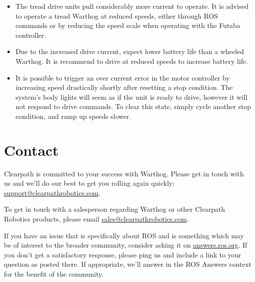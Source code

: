\documentclass[]{clearpath-latex/clearpath-manual}
\begin{document}
\begin{itemize}
\item The tread drive units pull considerably more current to operate. It is advised to operate a tread Warthog at reduced speeds, either through ROS commands or by reducing the speed scale when operating with the Futaba controller.
\item Due to the increased drive current, expect lower battery life than a wheeled Warthog. It is recommend to drive at reduced speeds to increase battery life.
\item It is possible to trigger an over current error in the motor controller by increasing speed drastically shortly after resetting a stop condition. The system's body lights will seem as if the unit is ready to drive, however it will not respond to drive commands. To clear this state, simply cycle another stop condition, and ramp up speeds slower.
\end{itemize}

\section{Contact}
\label{contact}

Clearpath is committed to your success with Warthog. Please get in touch with us and we’ll do our best to get
you rolling again quickly: \url{support@clearpathrobotics.com}.

To get in touch with a salesperson regarding Warthog or other Clearpath Robotics products, please email
\url{sales@clearpathrobotics.com}.

If you have an issue that is specifically about ROS and is something which may be of interest to the broader
community, consider asking it on \url{answers.ros.org}. If you don’t get a satisfactory response, please ping us and
include a link to your question as posted there. If appropriate, we’ll answer in the ROS Answers context for
the benefit of the community.

\appendix

\thispagestyle{empty}

\thispagestyle{empty}
\end{document}

